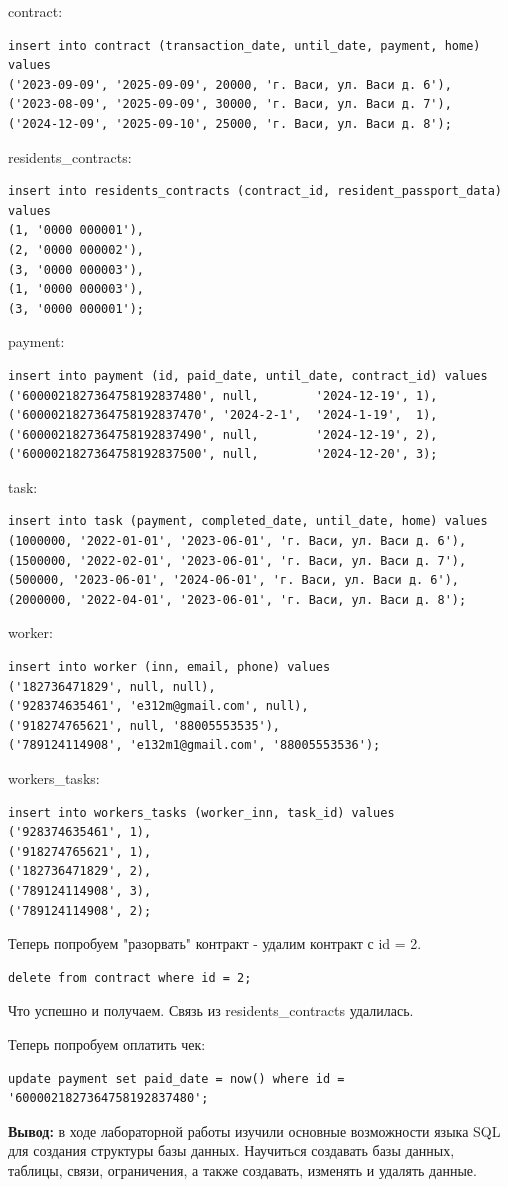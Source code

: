 \documentclass[a4paper,14pt]{extarticle}
\begin{document}
\begin{enumerate}[1.]
contract:
\begin{verbatim}
insert into contract (transaction_date, until_date, payment, home) values
('2023-09-09', '2025-09-09', 20000, 'г. Васи, ул. Васи д. 6'),
('2023-08-09', '2025-09-09', 30000, 'г. Васи, ул. Васи д. 7'),
('2024-12-09', '2025-09-10', 25000, 'г. Васи, ул. Васи д. 8');
\end{verbatim}
residents\_contracts:
\begin{verbatim}
insert into residents_contracts (contract_id, resident_passport_data) values
(1, '0000 000001'),
(2, '0000 000002'),
(3, '0000 000003'),
(1, '0000 000003'),
(3, '0000 000001');
\end{verbatim}
payment:
\begin{verbatim}
insert into payment (id, paid_date, until_date, contract_id) values
('6000021827364758192837480', null,        '2024-12-19', 1),
('6000021827364758192837470', '2024-2-1',  '2024-1-19',  1),
('6000021827364758192837490', null,        '2024-12-19', 2),
('6000021827364758192837500', null,        '2024-12-20', 3);
\end{verbatim}
task:
\begin{verbatim}
insert into task (payment, completed_date, until_date, home) values
(1000000, '2022-01-01', '2023-06-01', 'г. Васи, ул. Васи д. 6'),
(1500000, '2022-02-01', '2023-06-01', 'г. Васи, ул. Васи д. 7'),
(500000, '2023-06-01', '2024-06-01', 'г. Васи, ул. Васи д. 6'),
(2000000, '2022-04-01', '2023-06-01', 'г. Васи, ул. Васи д. 8');
\end{verbatim}
worker:
\begin{verbatim}
insert into worker (inn, email, phone) values
('182736471829', null, null), 
('928374635461', 'e312m@gmail.com', null), 
('918274765621', null, '88005553535'), 
('789124114908', 'e132m1@gmail.com', '88005553536');
\end{verbatim}
workers\_tasks:
\begin{verbatim}
insert into workers_tasks (worker_inn, task_id) values
('928374635461', 1),
('918274765621', 1),
('182736471829', 2),
('789124114908', 3),
('789124114908', 2);
\end{verbatim}

Теперь попробуем "разорвать" контракт - удалим контракт с id = 2.
\begin{verbatim}
delete from contract where id = 2;
\end{verbatim}
Что успешно и получаем. Связь из residents\_contracts удалилась.

Теперь попробуем оплатить чек:
\begin{verbatim}
update payment set paid_date = now() where id = '6000021827364758192837480';
\end{verbatim}

\end{enumerate}

\textbf{Вывод: } в ходе лабораторной работы изучили основные возможности языка SQL для создания 
структуры базы данных. Научиться создавать базы данных, таблицы, связи, 
ограничения, а также создавать, изменять и удалять данные. 
\end{document}
